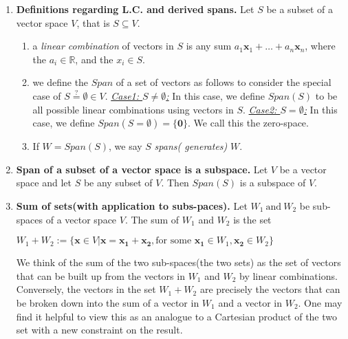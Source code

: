 \documentclass[oneside, 12pt]{book}
\newcommand{\settag}[1]{\renewcommand{\theenumi}{#1}}
\newcommand{\R}{\mathbb{R}}
\newcommand{\tit}[1]{\textit{#1}}
\newcommand{\vzero}{\mathbf{0}}
\begin{document}
    \begin{enumerate}
        \settag{1.3.1}
        \item \textbf{Definitions regarding L.C. and derived spans.} Let $S$ be a subset of a vector space $V$, that is $S\subseteq V$.
        \begin{enumerate}
            \item a \textit{linear combination} of vectors in $S$ is any sum $a_1\mathbf{x}_1 + \ldots + a_n\mathbf{x}_n$, 
            where the $a_i \in \R$, and the $x_i \in S$.
            \item we define the $Span$ of a set of vectors as follows to consider the special case of 
            $S\stackrel{?}{=}\emptyset \in V$.
            \newline \underline{\tit{Case1: $S\neq \emptyset$:}} In this case, we define $Span(S)$ to be all
             possible linear combinations using vectors in $S$.\newline
            \underline{\tit{Case2: $S= \emptyset$:}} In this case, we define $Span(S = \emptyset)=\{\vzero\}$. We call 
            this the zero-space.
            
            \item If $W=Span(S)$, we say $S$ \textit{spans( generates)} $W$.
        \end{enumerate}
        
        \settag{1.3.4}
        \item \textbf{Span of a  subset of a vector space is a subspace.} Let $V$ be a vector space and let $S$ be any subset of $V$. Then $Span(S)$ is a subspace of $V$.
        
        \settag{1.3.5}
        \item \textbf{Sum of sets(with application to subs-paces).} Let $W_1~\text{and}~W_2$ be sub-spaces of a vector space $V$. The sum of $W_1$ and $W_2$ is the set
        \begin{center}
            $W_1+W_2 :=\{\mathbf{x}\in V |\mathbf{x}=\mathbf{x_1}+\mathbf{x_2}, \text{for some } \mathbf{x_1}\in W_1, \mathbf{x_2} \in W_2\}$
        \end{center}
        We think of the sum of the two sub-spaces(the two sets) as the set of vectors that can be built up from the vectors in $W_1$ and $W_2$ by linear combinations. Conversely, the vectors in the set $W_1+W_2$ are precisely the vectors that can be broken down into the sum of a vector in $W_1$ and a vector in $W_2$. One may find it helpful to view this as an analogue to a Cartesian product of the two set with a new constraint on the result.
        

\end{enumerate}
\end{document}
